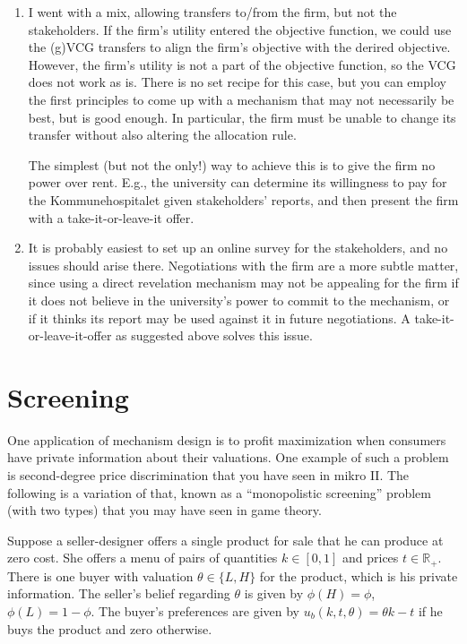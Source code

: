 \documentclass[a4paper]{article}
\begin{document}
\begin{enumerate}
	\item I went with a mix, allowing transfers to/from the firm, but not the stakeholders. If the firm's utility entered the objective function, we could use the (g)VCG transfers to align the firm's objective with the derired objective. However, the firm's utility is not a part of the objective function, so the VCG does not work as is. There is no set recipe for this case, but you can employ the first principles to come up with a mechanism that may not necessarily be best, but is good enough. In particular, the firm must be unable to change its transfer without also altering the allocation rule. 
	
	The simplest (but not the only!) way to achieve this is to give the firm no power over rent. E.g., the university can determine its willingness to pay for the Kommunehospitalet given stakeholders' reports, and then present the firm with a take-it-or-leave-it offer.
	
	\item It is probably easiest to set up an online survey for the stakeholders, and no issues should arise there. Negotiations with the firm are a more subtle matter, since using a direct revelation mechanism may not be appealing for the firm if it does not believe in the university's power to commit to the mechanism, or if it thinks its report may be used against it in future negotiations. A take-it-or-leave-it-offer as suggested above solves this issue. 
\end{enumerate}

\fi



\section{Screening}

One application of mechanism design is to profit maximization when consumers have private information about their valuations. One example of such a problem is second-degree price discrimination that you have seen in mikro II. The following is a variation of that, known as a ``monopolistic screening'' problem (with two types) that you may have seen in game theory.

Suppose a seller-designer offers a single product for sale that he can produce at zero cost. She offers a menu of pairs of quantities $k \in [0,1]$ and prices $t \in \mathbb{R}_+$. There is one buyer with valuation $\theta \in \{ L,H \}$ for the product, which is his private information. The seller's belief regarding $\theta$ is given by $\phi(H) = \phi$, $\phi(L)=1-\phi$. The buyer's preferences are given by $u_b(k,t,\theta) = \theta k - t$ if he buys the product and zero otherwise.
\end{document}

